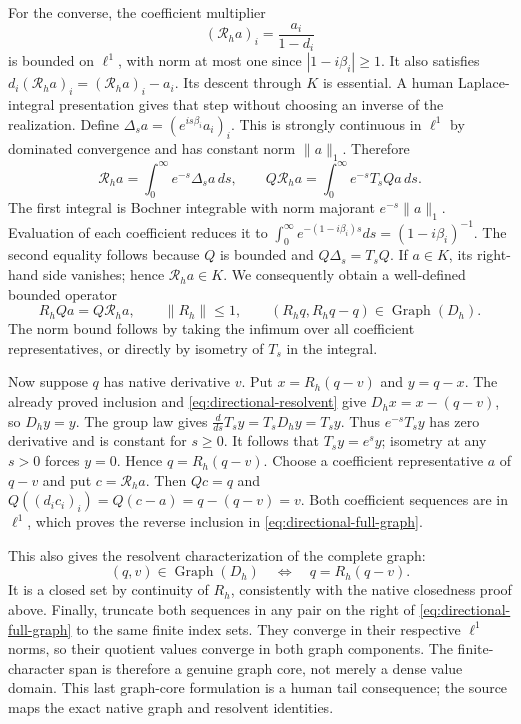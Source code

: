 \documentclass[11pt]{article}
\theoremstyle{remark}\newtheorem{remark}[theorem]{Remark}
\begin{document}
For the converse, the coefficient multiplier
\[
 (\mathcal R_h a)_i=\frac{a_i}{1-d_i}
\]
is bounded on $\ell^1$, with norm at most one since
$|1-i\beta_i|\geq1$. It also satisfies
$d_i(\mathcal R_h a)_i=(\mathcal R_h a)_i-a_i$.
Its descent through $K$ is essential. A human Laplace-integral
presentation gives that step without choosing an inverse of the
realization. Define
$\Delta_s a=(e^{is\beta_i}a_i)_i$. This is strongly continuous
in $\ell^1$ by dominated convergence and has constant norm
$\|a\|_1$. Therefore
\[
 \mathcal R_h a=\int_0^\infty e^{-s}\Delta_s a\,ds,
 \qquad
 Q\mathcal R_h a=\int_0^\infty e^{-s}T_sQa\,ds.
\]
The first integral is Bochner integrable with norm majorant
$e^{-s}\|a\|_1$. Evaluation of each coefficient reduces it to
$\int_0^\infty e^{-(1-i\beta_i)s}ds=(1-i\beta_i)^{-1}$.
The second equality follows because $Q$ is bounded and
$Q\Delta_s=T_sQ$. If $a\in K$, its right-hand side vanishes;
hence $\mathcal R_h a\in K$. We consequently obtain a
well-defined bounded operator
\begin{equation}\label{eq:directional-resolvent}
 R_hQa=Q\mathcal R_h a,\qquad \|R_h\|\leq1,
 \qquad (R_hq,R_hq-q)\in\operatorname{Graph}(D_h).
\end{equation}
The norm bound follows by taking the infimum over all coefficient
representatives, or directly by isometry of $T_s$ in the integral.

Now suppose $q$ has native derivative $v$. Put
$x=R_h(q-v)$ and $y=q-x$. The already proved inclusion and
\eqref{eq:directional-resolvent} give
$D_hx=x-(q-v)$, so $D_hy=y$.
The group law gives $\frac d{ds}T_sy=T_sD_hy=T_sy$.
Thus $e^{-s}T_sy$ has zero derivative and is constant for
$s\geq0$. It follows that $T_sy=e^s y$; isometry at any
$s>0$ forces $y=0$. Hence $q=R_h(q-v)$.
Choose a coefficient representative $a$ of $q-v$ and put
$c=\mathcal R_h a$. Then $Qc=q$ and
$Q((d_i c_i)_i)=Q(c-a)=q-(q-v)=v$.
Both coefficient sequences are in $\ell^1$, which proves the
reverse inclusion in \eqref{eq:directional-full-graph}.

This also gives the resolvent characterization of the complete
graph:
\[
 (q,v)\in\operatorname{Graph}(D_h)
       \quad\Longleftrightarrow\quad q=R_h(q-v).
\]
It is a closed set by continuity of $R_h$, consistently with the
native closedness proof above. Finally, truncate both sequences in
any pair on the right of \eqref{eq:directional-full-graph} to the
same finite index sets. They converge in their respective
$\ell^1$ norms, so their quotient values converge in both graph
components. The finite-character span is therefore a genuine
graph core, not merely a dense value domain. This last graph-core
formulation is a human tail consequence; the source maps the
exact native graph and resolvent identities.
\end{document}
